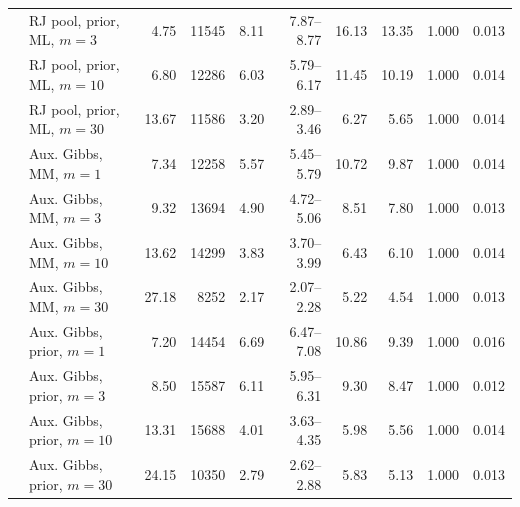 \begin{tabular}{ll rrrrrrrr}
 & RJ pool, prior, ML, $m{=}3$ & 4.75 & 11545 & 8.11 & 7.87--8.77 & 16.13 & 13.35 & 1.000 & 0.013 \\
 & RJ pool, prior, ML, $m{=}10$ & 6.80 & 12286 & 6.03 & 5.79--6.17 & 11.45 & 10.19 & 1.000 & 0.014 \\
 & RJ pool, prior, ML, $m{=}30$ & 13.67 & 11586 & 3.20 & 2.89--3.46 & 6.27 & 5.65 & 1.000 & 0.014 \\
 & Aux. Gibbs, MM, $m{=}1$ & 7.34 & 12258 & 5.57 & 5.45--5.79 & 10.72 & 9.87 & 1.000 & 0.014 \\
 & Aux. Gibbs, MM, $m{=}3$ & 9.32 & 13694 & 4.90 & 4.72--5.06 & 8.51 & 7.80 & 1.000 & 0.013 \\
 & Aux. Gibbs, MM, $m{=}10$ & 13.62 & 14299 & 3.83 & 3.70--3.99 & 6.43 & 6.10 & 1.000 & 0.014 \\
 & Aux. Gibbs, MM, $m{=}30$ & 27.18 & 8252 & 2.17 & 2.07--2.28 & 5.22 & 4.54 & 1.000 & 0.013 \\
 & Aux. Gibbs, prior, $m{=}1$ & 7.20 & 14454 & 6.69 & 6.47--7.08 & 10.86 & 9.39 & 1.000 & 0.016 \\
 & Aux. Gibbs, prior, $m{=}3$ & 8.50 & 15587 & 6.11 & 5.95--6.31 & 9.30 & 8.47 & 1.000 & 0.012 \\
 & Aux. Gibbs, prior, $m{=}10$ & 13.31 & 15688 & 4.01 & 3.63--4.35 & 5.98 & 5.56 & 1.000 & 0.014 \\
 & Aux. Gibbs, prior, $m{=}30$ & 24.15 & 10350 & 2.79 & 2.62--2.88 & 5.83 & 5.13 & 1.000 & 0.013 \\
\bottomrule
\end{tabular}
